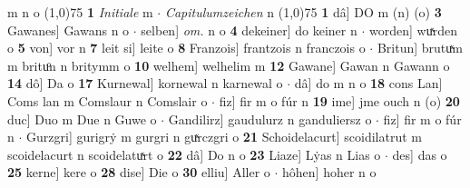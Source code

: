 \documentclass[8pt,a4paper,notitlepage]{article}
\begin{document}
\begin{table}[ht]
\begin{minipage}[t]{0.5\linewidth}
m n o \newline
\line(1,0){75} \newline
\textbf{1} \textit{Initiale} m   $\cdot$ \textit{Capitulumzeichen} n  \newline
\line(1,0){75} \newline
\textbf{1} dâ] DO m (n) (o) \textbf{3} Gawanes] Gawans n o  $\cdot$ selben] \textit{om.} n o \textbf{4} dekeiner] do keiner n  $\cdot$ worden] wuͯrden o \textbf{5} von] vor n \textbf{7} leit si] leite o \textbf{8} Franzois] frantzois n franczois o  $\cdot$ Britun] brutuͯm m brituͦn n britymm o \textbf{10} welhem] welhelim m \textbf{12} Gawane] Gawan n Gawann o \textbf{14} dô] Da o \textbf{17} Kurnewal] kornewal n karnewal o  $\cdot$ dâ] do m n o \textbf{18} cons Lan] Coms lan m Comslaur n Comslair o  $\cdot$ fiz] fir m o fúr n \textbf{19} ime] jme ouch n (o) \textbf{20} duc] Duo m Due n Guwe o  $\cdot$ Gandilirz] gaudulurz n ganduliersz o  $\cdot$ fiz] fir m o fúr n  $\cdot$ Gurzgri] gurigrẏ m gurgri n guͯrczgri o \textbf{21} Schoidelacurt] scoidilatrut m scoidelacurt n scoidelatuͯrt o \textbf{22} dâ] Do n o \textbf{23} Liaze] Lẏas n Lias o  $\cdot$ des] das o \textbf{25} kerne] kere o \textbf{28} dise] Die o \textbf{30} elliu] Aller o  $\cdot$ hôhen] hoher n o \newline
\end{minipage}
\end{table}
\newpage
\end{document}
